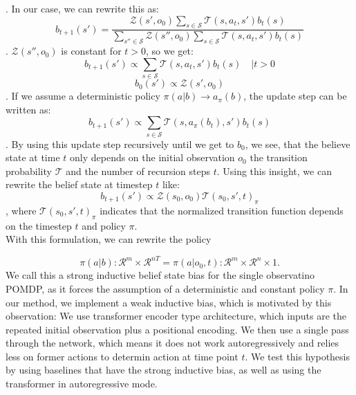 . In our case, we can rewrite this as:
\begin{equation}
    b_{t+1}(s') = \frac{\mathcal{Z}(s', o_{0}) \sum_{s \in \mathcal{S}} \mathcal{T}(s, a_t, s') b_t(s)}{\sum_{s'' \in \mathcal{S}} \mathcal{Z}(s'', o_{0}) \sum_{s \in \mathcal{S}} \mathcal{T}(s, a_t, s') b_t(s)}
\end{equation}
. $\mathcal{Z}(s'', o_{0})$ is constant for $t>0$, so we get:
\begin{equation}
    b_{t+1}(s') \propto \sum_{s \in \mathcal{S}} \mathcal{T}(s, a_t, s') b_t(s) \quad | t > 0
\end{equation}
\begin{equation*}
    b_{0}(s') \propto \mathcal{Z}(s', o_{0})
\end{equation*}
. If we assume a deterministic policy $\pi(a|b) \rightarrow a_{\pi}(b)$, the update step can be written as:
\begin{equation}
    b_{t+1}(s') \propto \sum_{s \in \mathcal{S}} \mathcal{T}(s, a_{\pi}(b_t), s') b_t(s)
\end{equation}
. By using this update step recursively until we get to $b_{0}$, we see, that the believe state at time $t$ only depends on the initial observation $o_0$
the transition probability $\mathcal{T}$ and the number of recursion steps $t$. Using this insight, we can rewrite the belief state at timestep $t$ like:
\begin{equation}
    b_{t+1}(s') \propto \mathcal{Z}(s_0, o_{0}) \mathcal{T}(s_0, s', t)_{\pi}
\end{equation}
, where $\mathcal{T}(s_0, s', t)_{\pi}$ indicates that the normalized transition function depends on the timestep $t$ and policy $\pi$.\\
With this formulation, we can rewrite the policy 

\begin{equation}
    \pi(a|b) : \mathcal{R}^m \times \mathcal{R}^{n T} = \pi(a|o_0, t): \mathcal{R}^m \times \mathcal{R}^{n} \times 1.
\end{equation}
We call this a strong inductive belief state bias for the single observatino POMDP, as it forces the assumption of a deterministic and constant policy $\pi$. 
In our method, we implement a weak inductive bias, which is motivated by this observation: We use transformer encoder type architecture, which inputs are 
the repeated initial observation plus a positional encoding. We then use a single pass through the network, which means it does not work autoregressively and 
relies less on former actions to determin action at time point $t$. We test this hypothesis by using baselines that have the strong inductive bias, as well as 
using the transformer in autoregressive mode. \\

